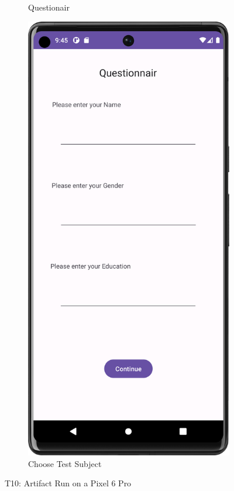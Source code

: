 \begin{figure}[htbp]
\begin{subfigure}[b]{0.25\textwidth}
        \caption{ Questionair} %
        \label{subfig:QuestionairPixel}
    \end{subfigure}
        \hspace{1cm}
    \begin{subfigure}[b]{0.25\textwidth}
        \centering
        \includegraphics[width=\textwidth]{content/07_evaluation_of_the_solution/Screenshot_T10c.png}
        \caption{Choose Test Subject}
        \label{subfig:chooseTestSubjectPixel}
    \end{subfigure}
       \caption{T10: Artifact Run on a Pixel 6 Pro}
       \label{fig:uiScreensPixel6}
\end{figure}


